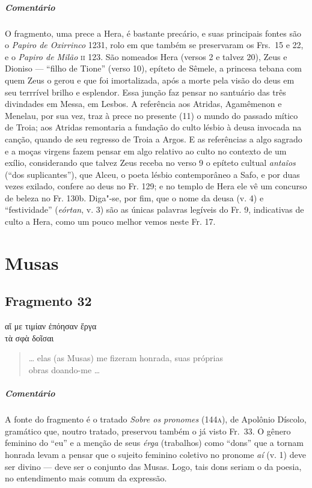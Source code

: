 {\pagebreak
{\paragraph{Comentário} O fragmento, uma prece a Hera, é bastante precário, e suas principais fontes são o \textit{Papiro de Oxirrinco} 1231, rolo em que também se preservaram os Frs.~15 e 22, e o \textit{Papiro de Milão} \textsc{ii} 123. São nomeados Hera (versos 2 e talvez 20), Zeus e Dioniso --- ``filho de Tione'' (verso 10), epíteto de Sêmele, a princesa tebana com quem Zeus o gerou e que foi imortalizada, após a morte pela visão do deus em seu terrrível brilho e esplendor. Essa junção faz pensar no santuário das três divindades em Messa, em Lesbos. A referência aos Atridas, Agamêmenon e Menelau, por sua vez, traz à prece no presente (11) o mundo do passado mítico de Troia; aos Atridas remontaria a fundação do culto lésbio à deusa invocada na canção, quando de seu regresso de Troia a Argos. E as referências a algo sagrado e a moças virgens
fazem pensar em algo relativo ao culto no contexto de um exílio, considerando que talvez Zeus receba no verso 9 o epíteto cultual \textit{antaîos} (``dos suplicantes''), que Alceu, o poeta lésbio contemporâneo a Safo, e por duas vezes exilado, confere ao deus no Fr. 129; e no templo de Hera ele vê um concurso de beleza no Fr. 130b. Diga"-se, por fim, que o nome da deusa (v. 4) e ``festividade'' (\textit{eórtan}, v. 3) são as únicas palavras legíveis do Fr. 9, indicativas de culto a Hera, como um pouco melhor vemos neste Fr. 17.}



\chapter{Musas}

\section{Fragmento 32}

\begin{gkverse}
αἴ με τιμίαν ἐπόησαν ἔργα\\
τὰ σφὰ δοῖσαι
\end{gkverse}

\begin{verse}
\ldots{} elas (as Musas) me fizeram honrada, suas próprias\\
obras doando-me \ldots{}
\end{verse}

{\paragraph{Comentário} A fonte do fragmento é o tratado \textit{Sobre os pronomes} (144\textsc{a}), de Apolônio
Díscolo, gramático que, noutro tratado, preservou também o já visto Fr.~33. O
gênero feminino do “eu” e a menção de seus \textit{érga }(trabalhos) como
``dons” que a tornam honrada levam a pensar que o sujeito feminino
coletivo no pronome \textit{aí} (v. 1) deve ser divino --- deve ser o conjunto das Musas. Logo, tais dons
seriam o da poesia, no entendimento mais comum da expressão.}


}
